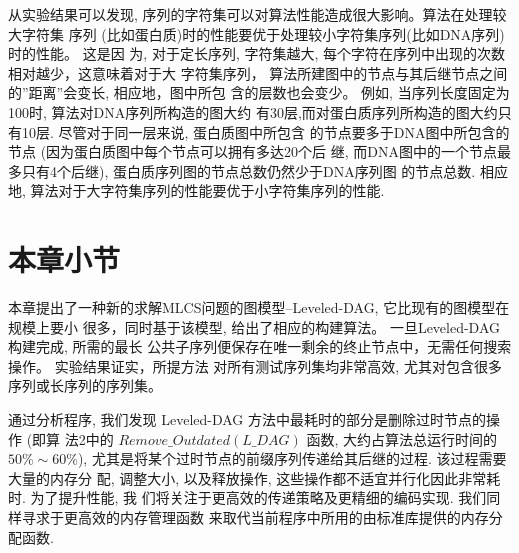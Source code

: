 \documentclass[utf8]{frontiersSCNS} %
\begin{document}
从实验结果可以发现, 序列的字符集可以对算法性能造成很大影响。算法在处理较大字符集
序列 (比如蛋白质)时的性能要优于处理较小字符集序列(比如DNA序列)时的性能。 这是因
为, 对于定长序列, 字符集越大, 每个字符在序列中出现的次数相对越少，这意味着对于大
字符集序列， 算法所建图中的节点与其后继节点之间的''距离''会变长, 相应地，图中所包
含的层数也会变少。 例如, 当序列长度固定为100时, 算法对DNA序列所构造的图大约
有30层,而对蛋白质序列所构造的图大约只有10层. 尽管对于同一层来说, 蛋白质图中所包含
的节点要多于DNA图中所包含的节点 (因为蛋白质图中每个节点可以拥有多达20个后
继, 而DNA图中的一个节点最多只有4个后继), 蛋白质序列图的节点总数仍然少于DNA序列图
的节点总数. 相应地, 算法对于大字符集序列的性能要优于小字符集序列的性能.

\section{本章小节
}
\label{sec:conculsion}

本章提出了一种新的求解MLCS问题的图模型--Leveled-DAG, 它比现有的图模型在规模上要小
很多，同时基于该模型, 给出了相应的构建算法。 一旦Leveled-DAG构建完成, 所需的最长
公共子序列便保存在唯一剩余的终止节点中，无需任何搜索操作。 实验结果证实，所提方法
对所有测试序列集均非常高效, 尤其对包含很多序列或长序列的序列集。

通过分析程序, 我们发现 Leveled-DAG 方法中最耗时的部分是删除过时节点的操作 (即算
法2中的 $Remove\_Outdated(L\_DAG)$ 函数, 大约占算法总运行时间的 $50\% \sim
60\%$), 尤其是将某个过时节点的前缀序列传递给其后继的过程. 该过程需要大量的内存分
配, 调整大小, 以及释放操作, 这些操作都不适宜并行化因此非常耗时. 为了提升性能, 我
们将关注于更高效的传递策略及更精细的编码实现. 我们同样寻求于更高效的内存管理函数
来取代当前程序中所用的由标准库提供的内存分配函数.
\end{document}
